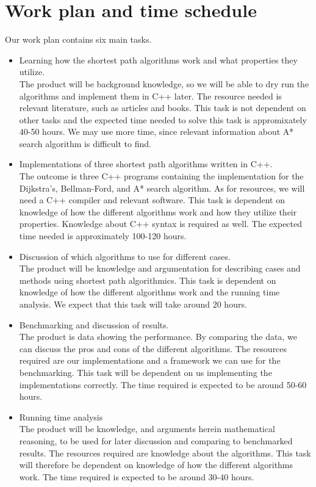 \documentclass[11pt]{article}
\begin{document}
\section{Work plan and time schedule}
Our work plan contains six main tasks.
\begin{itemize}
\item Learning how the shortest path algorithms work and what properties they utilize.\\
The product will be background knowledge, so we will be able to dry run the algorithms and implement them in C++ later. The resource needed is relevant literature, such as articles and books. This task is not dependent on other tasks and the expected time needed to solve this task is appromixately 40-50 hours. We may use more time, since relevant information about A* search algorithm is difficult to find.

\item Implementations of three shortest path algorithms written in C++.\\
The outcome is three C++ programs containing the implementation for the Dijkstra's, Bellman-Ford, and A* search algorithm. As for resources, we will need a C++ compiler and relevant software. This task is dependent on knowledge of how the different algorithms work and how they utilize their properties. Knowledge about C++ syntax is required as well. The expected time needed is approximately 100-120 hours.

\item Discussion of which algorithms to use for different cases.\\
The product will be knowledge and argumentation for describing cases and methods using shortest path algorithmics. This task is dependent on knowledge of how the different algorithms work and the running time analysis. We expect that this task will take around 20 hours.

\item Benchmarking and discussion of results.\\
The product is data showing the performance. By comparing the data, we can discuss the pros and cons of the different algorithms. The resources required are our implementations and a framework we can use for the benchmarking. This task will be dependent on us implementing the implementations correctly. The time required is expected to be around 50-60 hours.

\item Running time analysis\\
The product will be knowledge, and arguments herein mathematical reasoning, to be used for later discussion and comparing to benchmarked results. The resources required are knowledge about the algorithms. This task will therefore be dependent on   knowledge of how the different algorithms work. The time required is expected to be around 30-40 hours.


\end{itemize}
\end{document}
